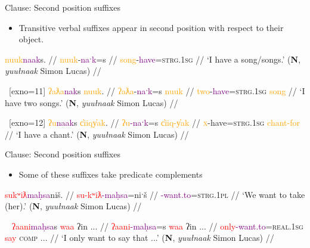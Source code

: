 \begin{frame}{Clause: Second position suffixes}

\begin{itemize}
\item Transitive verbal suffixes appear in second position with respect to their object.
\end{itemize}

\pause

\ex[exno=10]
\begingl
\glpreamble \textcolor{orange}{nuuk}\textcolor{Purple}{naak}s. //
\gla \textcolor{orange}{nuuk}-\textcolor{Purple}{naˑk}=s //
\glb \textcolor{orange}{song}-\textcolor{Purple}{have}=\textsc{strg.1sg} //
\glft `I have a song/songs.' (\textbf{N}, \textit{yuułnaak} Simon Lucas) //
\endgl \label{ex:havesong}
\xe

\ex~[exno=11]
\begingl
\glpreamble \textcolor{orange}{ʔaƛa}\textcolor{Purple}{nak}s \textcolor{orange}{nuuk}. //
\gla \textcolor{orange}{ʔaƛa}-\textcolor{Purple}{naˑk}=s \textcolor{orange}{nuuk} //
\glb \textcolor{orange}{two}-\textcolor{Purple}{have}=\textsc{strg.1sg} \textcolor{orange}{song} //
\glft `I have two songs.' (\textbf{N}, \textit{yuułnaak} Simon Lucas) //
\endgl \label{ex:havetwosongs}
\xe


\ex~[exno=12]
\begingl
\glpreamble \textcolor{orange}{ʔu}\textcolor{Purple}{naak}s \textcolor{orange}{c̓iiqy̓ak}. //
\gla \textcolor{orange}{ʔu}\textcolor{Purple}{-naˑk}=s \textcolor{orange}{c̓iiq-y̓ak} //
\glb \textcolor{orange}{\textsc{x}}-have=\textsc{strg.1sg} \textcolor{orange}{chant-for} //
\glft `I have a chant.' (\textbf{N}, \textit{yuułnaak} Simon Lucas) //
\endgl  \label{ex:havechant}
\xe

\end{frame}


\begin{frame}{Clause: Second position suffixes}

\begin{itemize}
\item Some of these suffixes take predicate complements
\end{itemize}

\ex[exno=13]
\begingl
\glpreamble \textcolor{red}{sukʷiƛ}\textcolor{Purple}{maḥsa}niš. //
\gla \textcolor{red}{su-kʷiƛ}\textcolor{Purple}{-maḥsa}=niˑš //
\textcolor{Purple}{-want.to}=\textsc{strg.1pl} //
\glft `We want to take (her).' (\textbf{N}, \textit{yuułnaak} Simon Lucas) //
\endgl \label{ex:wanttograb}
\xe

\ex[exno=14]~
\begingl
\glpreamble \textcolor{red}{ʔaani}\textcolor{Purple}{maḥsa}s \textcolor{red}{waa} ʔin ... //
\gla \textcolor{red}{ʔaani}\textcolor{Purple}{-maḥsa}=s \textcolor{red}{waa} ʔin  ... //
\glb \textcolor{red}{only}\textcolor{Purple}{-want.to}=\textsc{real.1sg} \textcolor{red}{say} \textsc{comp} ... //
\glft `I only want to say that ...' (\textbf{N}, \textit{yuułnaak} Simon Lucas) //
\endgl \label{ex:onlywanttosay}
\xe
	
\end{frame}

